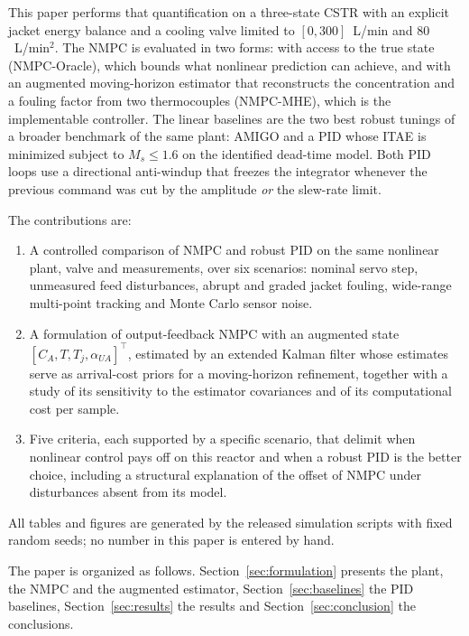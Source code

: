 This paper performs that quantification on a three-state CSTR with an explicit jacket energy balance and a cooling valve limited to $[0, 300]$~L/min and $80$~L/min$^2$. The NMPC is evaluated in two forms: with access to the true state (NMPC-Oracle), which bounds what nonlinear prediction can achieve, and with an augmented moving-horizon estimator that reconstructs the concentration and a fouling factor from two thermocouples (NMPC-MHE), which is the implementable controller. The linear baselines are the two best robust tunings of a broader benchmark of the same plant: AMIGO and a PID whose ITAE is minimized subject to $M_s \le 1.6$ on the identified dead-time model. Both PID loops use a directional anti-windup that freezes the integrator whenever the previous command was cut by the amplitude \emph{or} the slew-rate limit.

The contributions are:
\begin{enumerate}
    \item A controlled comparison of NMPC and robust PID on the same nonlinear plant, valve and measurements, over six scenarios: nominal servo step, unmeasured feed disturbances, abrupt and graded jacket fouling, wide-range multi-point tracking and Monte Carlo sensor noise.
    \item A formulation of output-feedback NMPC with an augmented state $[C_A, T, T_j, \alpha_{UA}]^\top$, estimated by an extended Kalman filter whose estimates serve as arrival-cost priors for a moving-horizon refinement, together with a study of its sensitivity to the estimator covariances and of its computational cost per sample.
    \item Five criteria, each supported by a specific scenario, that delimit when nonlinear control pays off on this reactor and when a robust PID is the better choice, including a structural explanation of the offset of NMPC under disturbances absent from its model.
\end{enumerate}
All tables and figures are generated by the released simulation scripts with fixed random seeds; no number in this paper is entered by hand.

The paper is organized as follows. Section~\ref{sec:formulation} presents the plant, the NMPC and the augmented estimator, Section~\ref{sec:baselines} the PID baselines, Section~\ref{sec:results} the results and Section~\ref{sec:conclusion} the conclusions.
